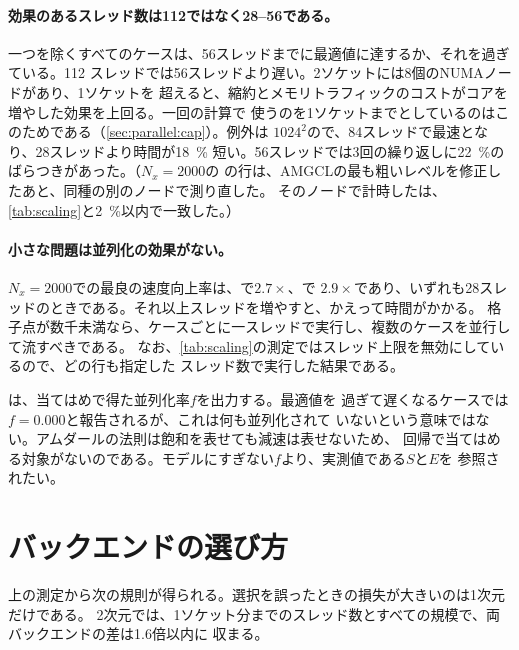 \paragraph{効果のあるスレッド数は112ではなく28--56である。}
一つを除くすべてのケースは、56スレッドまでに最適値に達するか、それを過ぎている。112
スレッドでは56スレッドより遅い。2ソケットには8個のNUMAノードがあり、1ソケットを
超えると、縮約とメモリトラフィックのコストがコアを増やした効果を上回る。一回の計算で
使うのを1ソケットまでとしているのはこのためである（\cref{sec:parallel:cap}）。例外は
$1024^2$ので、84スレッドで最速となり、28スレッドより時間が\SI{18}{\percent}
短い。56スレッドでは3回の繰り返しに\SI{22}{\percent}のばらつきがあった。（$N_x = 2000$の
の行は、AMGCLの最も粗いレベルを修正したあと、同種の別のノードで測り直した。
そのノードで計時したは、\cref{tab:scaling}と\SI{2}{\percent}以内で一致した。）

\paragraph{小さな問題は並列化の効果がない。}
$N_x = 2000$での最良の速度向上率は、で$2.7\times$、で
$2.9\times$であり、いずれも28スレッドのときである。それ以上スレッドを増やすと、かえって時間がかかる。
格子点が数千未満なら、ケースごとに一スレッドで実行し、複数のケースを並行して流すべきである。
なお、\cref{tab:scaling}の測定ではスレッド上限を無効にしているので、どの行も指定した
スレッド数で実行した結果である。

\begin{note}[集計ツールのアムダール近似の読み方]
  は、当てはめで得た並列化率$f$を出力する。最適値を
  過ぎて遅くなるケースでは$f = 0.000$と報告されるが、これは何も並列化されて
  いないという意味ではない。アムダールの法則は飽和を表せても減速は表せないため、
  回帰で当てはめる対象がないのである。モデルにすぎない$f$より、実測値である$S$と$E$を
  参照されたい。
\end{note}

\section{バックエンドの選び方}
\label{sec:parallel:backend}

上の測定から次の規則が得られる。選択を誤ったときの損失が大きいのは1次元だけである。
2次元では、1ソケット分までのスレッド数とすべての規模で、両バックエンドの差は1.6倍以内に
収まる。

